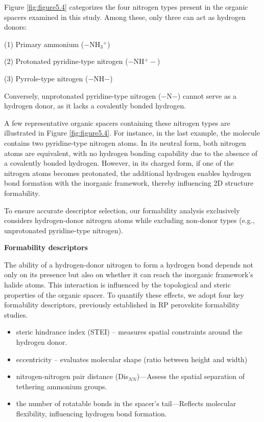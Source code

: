 Figure \ref{fig:figure5.4} categorizes the four nitrogen types present in the organic spacers examined in this study. Among these, only three can act as hydrogen donors:

(1) Primary ammonium ($-$NH$_3$$^+$)

(2) Protonated pyridine-type nitrogen ($-$NH$^+-$)

(3) Pyrrole-type nitrogen ($-$NH$-$)

Conversely, unprotonated pyridine-type nitrogen ($-$N$-$) cannot serve as a hydrogen donor, as it lacks a covalently bonded hydrogen. 

A few representative organic spacers containing these nitrogen types are illustrated in Figure \ref{fig:figure5.4}. For instance, in the last example, the molecule contains two pyridine-type nitrogen atoms. In its neutral form, both nitrogen atoms are equivalent, with no hydrogen bonding capability due to the absence of a covalently bonded hydrogen. However, in its charged form, if one of the nitrogen atoms becomes protonated, the additional hydrogen enables hydrogen bond formation with the inorganic framework, thereby influencing 2D structure formability.

To ensure accurate descriptor selection, our formability analysis exclusively considers hydrogen-donor nitrogen atoms while excluding non-donor types (e.g., unprotonated pyridine-type nitrogen).

\textbf{Formability descriptors}

The ability of a hydrogen-donor nitrogen to form a hydrogen bond depends not only on its presence but also on whether it can reach the inorganic framework’s halide atoms. This interaction is influenced by the topological and steric properties of the organic spacer.
To quantify these effects, we adopt four key formability descriptors, previously established in RP perovskite formability studies\cite{RN315,RN12}.

\begin{itemize}
    \item steric hindrance index (STEI) – measures spatial constraints around the hydrogen donor.
    \item eccentricity – evaluates molecular shape (ratio between height and width)
    \item nitrogen-nitrogen pair distance (Dis$_{NN}$)—Assess the spatial separation of tethering ammonium groups.
    \item the number of rotatable bonds in the spacer’s tail—Reflects molecular flexibility, influencing hydrogen bond formation.
\end{itemize}

